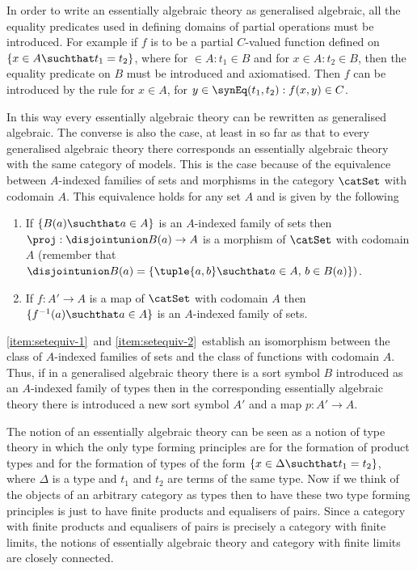 In order to write an essentially algebraic theory as generalised algebraic, all the equality predicates used in defining domains of partial operations must be introduced.
%
For example if $f$ is to be a partial $C$-valued function defined on $\{ x \in A \suchthat t_1 = t_2 \}$, where for $ \in A : t_1 \in B$ and for $x \in A : t_2 \in B$, then the equality predicate on $B$ must be introduced and axiomatised.
%
Then $f$ can be introduced by the rule for $x \in A$, for $y \in \synEq(t_1,t_2) : f(x,y) \in C$.


In this way every essentially algebraic theory can be rewritten as generalised algebraic.
%
The converse is also the case, at least in so far as that to every generalised algebraic theory there corresponds an essentially algebraic theory with the same category of models.
%
This is the case because of the equivalence between $A$-indexed families of sets and morphisms in the category $\catSet$ with codomain $A$.
%
This equivalence holds for any set $A$ and is given by the following

\begin{enumerate}[1.]
  \item \label{item:setequiv-1} If $\{ B(a) \suchthat a \in A \}$ is an $A$-indexed family of sets then $\proj : \disjointunion B(a) \to A$ is a morphism of $\catSet$ with codomain $A$ (remember that $\disjointunion B(a) = \{\tuple{a,b} \suchthat a \in A,\, b \in B(a) \})$.
  \item \label{item:setequiv-2} If $f : A' \to A$ is a map of $\catSet$ with codomain $A$ then $\{ f^{-1}(a) \suchthat a \in A \}$ is an $A$-indexed family of sets.
\end{enumerate}

\ref{item:setequiv-1}~and \ref{item:setequiv-2}~establish an isomorphism between the class of $A$-indexed families of sets and the class of functions with codomain $A$.
%
%
Thus, if in a generalised algebraic theory there is a sort symbol $B$ introduced as an $A$-indexed family of types then in the corresponding essentially algebraic theory there is introduced a new sort symbol $A'$ and a map $p : A' \to A$.

The notion of an essentially algebraic theory can be seen as a notion of type theory in which the only type forming principles are for the formation of product types and for the formation of types of the form $\{ x \in \Delta \suchthat t_1 = t_2 \}$, where $\Delta$ is a type and $t_1$ and $t_2$ are terms of the same type.
%
Now if we think of the objects of an arbitrary category as types then to have these two type forming principles is just to have finite products and equalisers of pairs.
%
%
Since a category with finite products and equalisers of pairs is precisely a category with finite limits, the notions of essentially algebraic theory and category with finite limits are closely connected.

